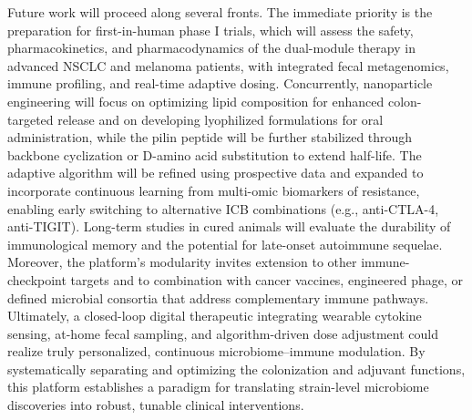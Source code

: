 \documentclass{article}
\begin{document}
Future work will proceed along several fronts. The immediate priority is the preparation for first-in-human phase I trials, which will assess the safety, pharmacokinetics, and pharmacodynamics of the dual-module therapy in advanced NSCLC and melanoma patients, with integrated fecal metagenomics, immune profiling, and real-time adaptive dosing. Concurrently, nanoparticle engineering will focus on optimizing lipid composition for enhanced colon-targeted release and on developing lyophilized formulations for oral administration, while the pilin peptide will be further stabilized through backbone cyclization or D-amino acid substitution to extend half-life. The adaptive algorithm will be refined using prospective data and expanded to incorporate continuous learning from multi-omic biomarkers of resistance, enabling early switching to alternative ICB combinations (e.g., anti-CTLA-4, anti-TIGIT). Long-term studies in cured animals will evaluate the durability of immunological memory and the potential for late-onset autoimmune sequelae. Moreover, the platform's modularity invites extension to other immune-checkpoint targets and to combination with cancer vaccines, engineered phage, or defined microbial consortia that address complementary immune pathways. Ultimately, a closed-loop digital therapeutic integrating wearable cytokine sensing, at-home fecal sampling, and algorithm-driven dose adjustment could realize truly personalized, continuous microbiome–immune modulation. By systematically separating and optimizing the colonization and adjuvant functions, this platform establishes a paradigm for translating strain-level microbiome discoveries into robust, tunable clinical interventions.



\end{document}
